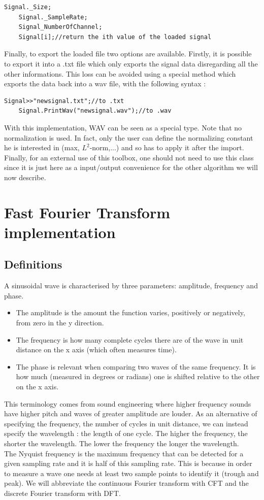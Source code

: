 \documentclass[a4paper]{report}
\begin{document}
\begin{lstlisting}[basicstyle=\tiny]
    Signal._Size;
    Signal._SampleRate;
    Signal_NumberOfChannel;
    Signal[i];//return the ith value of the loaded signal
\end{lstlisting}
Finally, to export the loaded file two options are available. Firstly, it is possible to export it into a .txt file which only exports the signal data disregarding all the other informations. This loss can be avoided using a special method which exports the data back into a wav file, with the following syntax :

\begin{lstlisting}[basicstyle=\tiny]
    Signal>>"newsignal.txt";//to .txt
    Signal.PrintWav("newsignal.wav");//to .wav
\end{lstlisting}
With this implementation, WAV can be seen as a special type. Note that no normalization is used. In fact, only the user can define the normalizing constant he is interested in (max, $L^2$-norm,...) and so has to apply it after the import.
Finally, for an external use of this toolbox, one should not need to use this class since it is just here as a input/output convenience for the other algorithm we will now describe.

\chapter{Fast Fourier Transform implementation}
\section{Definitions}
A sinusoidal wave is characterised by three parameters: amplitude, frequency and phase.
\begin{itemize}
\item The amplitude is the amount the function varies, positively or negatively, from zero in the y direction.
\item The frequency is how many complete cycles there are of the wave in unit distance on the x axis (which often measures time).
\item The phase is relevant when comparing two waves of the same frequency. It is how much (measured in degrees or radians) one is shifted relative to the other on the x axis.
\end{itemize}
This terminology comes from sound engineering where higher frequency sounds have higher pitch and waves of greater amplitude are louder.
As an alternative of specifying the frequency, the number of cycles in unit distance, we can instead specify the wavelength : the length of one cycle. The higher the frequency, the shorter the wavelength. The lower the frequency the longer the wavelength.
\\
The Nyquist frequency is the maximum frequency that can be detected for a given sampling rate and it is half of this sampling rate. This is because in order to measure a wave one needs at least two sample points to identify it (trough and peak).
We will abbreviate the continuous Fourier transform with CFT and the discrete Fourier transform with DFT.
\end{document}
